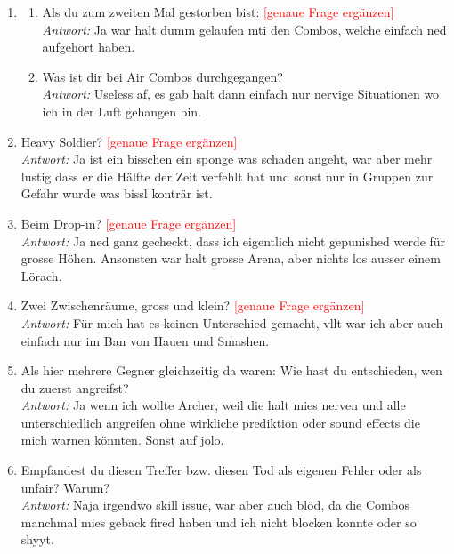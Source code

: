 \documentclass[../Main.tex]{subfiles}
\begin{document}
\begin{enumerate}[label=\textbf{I\arabic*}, leftmargin=1.5cm, itemsep=1em]
\item
\begin{enumerate}[label=\alph*), itemsep=0.6em]
\item Als du zum zweiten Mal gestorben bist: \textcolor{red}{[genaue Frage ergänzen]} \\
    \textit{Antwort:} Ja war halt dumm gelaufen mti den Combos, welche einfach ned aufgehört haben.
\item Was ist dir bei Air Combos durchgegangen? \\
    \textit{Antwort:} Useless af, es gab halt dann einfach nur nervige Situationen wo ich in der Luft gehangen bin.
\end{enumerate}

\item Heavy Soldier? \textcolor{red}{[genaue Frage ergänzen]} \\
\textit{Antwort:} Ja ist ein bisschen ein sponge was schaden angeht, war aber mehr lustig dass er die Hälfte der Zeit verfehlt hat und sonst nur in Gruppen zur Gefahr wurde was bissl konträr ist.

\item Beim Drop-in? \textcolor{red}{[genaue Frage ergänzen]} \\
\textit{Antwort:} Ja ned ganz gecheckt, dass ich eigentlich nicht gepunished werde für grosse Höhen. Ansonsten war halt grosse Arena, aber nichts los ausser einem Lörach.

\item Zwei Zwischenräume, gross und klein? \textcolor{red}{[genaue Frage ergänzen]} \\
\textit{Antwort:} Für mich hat es keinen Unterschied gemacht, vllt war ich aber auch einfach nur im Ban von Hauen und Smashen.

\item Als hier mehrere Gegner gleichzeitig da waren: Wie hast du entschieden, wen du zuerst angreifst? \\
\textit{Antwort:} Ja wenn ich wollte Archer, weil die halt mies nerven und alle unterschiedlich angreifen ohne wirkliche prediktion oder sound effects die mich warnen könnten. Sonst auf jolo.

\item Empfandest du diesen Treffer bzw. diesen Tod als eigenen Fehler oder als unfair? Warum? \\
\textit{Antwort:} Naja irgendwo skill issue, war aber auch blöd, da die Combos manchmal mies geback fired haben und ich nicht blocken konnte oder so shyyt.


\end{enumerate}
\end{document}
